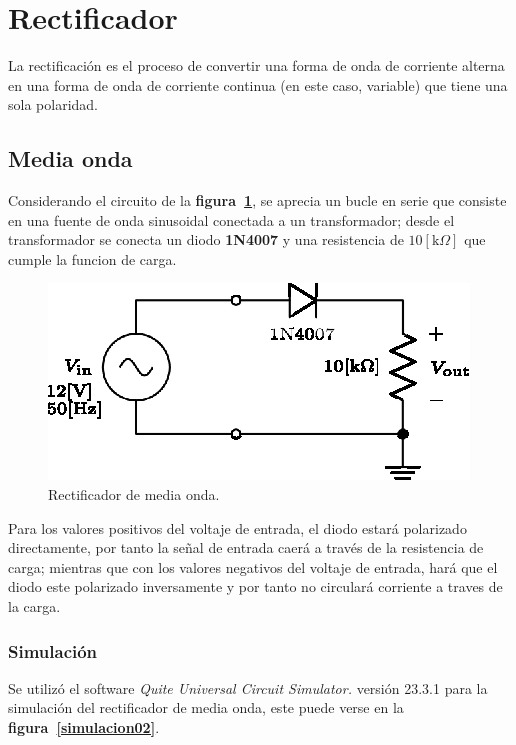 \section{Rectificador}
La rectificación es el proceso de convertir una forma de onda de corriente
alterna en una forma de onda de corriente continua (en este caso, variable) que
tiene una sola polaridad.

\subsection{Media onda}
Considerando el circuito de la \textbf{figura~\ref{circuito02}}, se aprecia un
bucle en serie que consiste en una fuente de onda sinusoidal conectada a un
transformador; desde el transformador se conecta un diodo \textbf{1N4007} y una
resistencia de $10[\text{k}\Omega]$ que cumple la funcion de carga.

\begin{figure}[!h]
\centering
\includegraphics[scale=1]{diagramas/02.media_onda1.eps}
\caption{Rectificador de media onda.}
\label{circuito02}
\end{figure}

Para los valores positivos del voltaje de entrada, el diodo estará polarizado
directamente, por tanto la señal de entrada caerá a través de la resistencia de
carga; mientras que con los valores negativos del voltaje de entrada, hará que
el diodo este polarizado inversamente y por tanto no circulará corriente a
traves de la carga.

\subsubsection{Simulación}
Se utilizó el software \emph{Quite Universal Circuit Simulator.} versión 23.3.1
para la simulación del rectificador de media onda, este puede verse en la
\textbf{figura~\ref{simulacion02}}.

